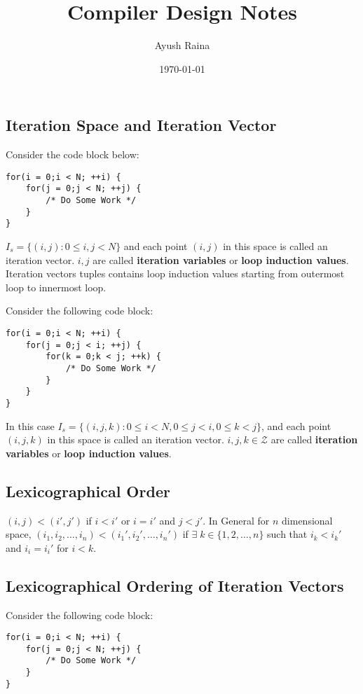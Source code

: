 \documentclass{article}
\title{Compiler Design Notes}
\author{Ayush Raina}
\date{\today}
\begin{document}
 

\maketitle

\subsection*{Iteration Space and Iteration Vector}
Consider the code block below:
\begin{lstlisting}
for(i = 0;i < N; ++i) {
    for(j = 0;j < N; ++j) {
        /* Do Some Work */
    }
}
\end{lstlisting}
$I_s = \{(i,j) : 0 \leq i,j < N\}$ and each point $(i,j)$ in this space is called an iteration vector. $i,j$ are called \textbf{iteration variables} or \textbf{loop induction values}. Iteration vectors tuples contains loop induction values starting from outermost loop to innermost loop.

Consider the following code block:
\begin{lstlisting}
for(i = 0;i < N; ++i) {
    for(j = 0;j < i; ++j) {
        for(k = 0;k < j; ++k) {
            /* Do Some Work */
        }
    }
}
\end{lstlisting}

In this case $I_s = \{(i,j,k) : 0 \leq i < N, 0 \leq j < i, 0 \leq k < j\}$, and each point $(i,j,k)$ in this space is called an iteration vector. $i,j,k \in \mathcal{Z}$ are called \textbf{iteration variables} or \textbf{loop induction values}.

\subsection*{Lexicographical Order}
$(i,j) < (i',j')$ if $i < i'$ or $i = i'$ and $j < j'$. In General for $n$ dimensional space, $(i_1,i_2,\ldots,i_n) < (i_1',i_2',\ldots,i_n')$ if $\exists \; k \in \{1,2,\ldots,n\}$ such that $i_k < i_k'$ and $i_i = i_i'$ for $i < k$.

\subsection*{Lexicographical Ordering of Iteration Vectors}
Consider the following code block:
\begin{lstlisting}
for(i = 0;i < N; ++i) {
    for(j = 0;j < N; ++j) {
        /* Do Some Work */
    }
}
\end{lstlisting}
\end{document}
